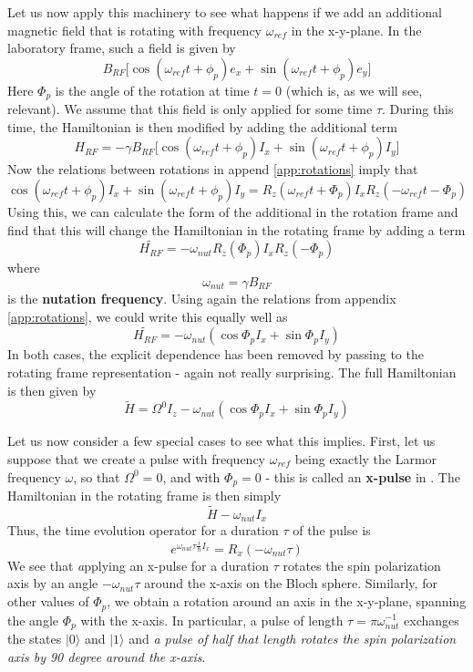 \documentclass[a4paper, draft]{article}
\theoremstyle{own}
\theoremstyle{remark}
\begin{document}
Let us now apply this machinery to see what happens if we add an additional magnetic field that is rotating with frequency $\omega_{ref}$ in the x-y-plane. In the laboratory frame, such a field is given by
$$
B_{RF} \big[ \cos (\omega_{ref} t + \phi_p) e_x + \sin(\omega_{ref} t + \phi_p) e_y \big] 
$$
Here $\Phi_p$ is the angle of the rotation at time $t = 0$ (which is, as we will see, relevant). We assume that this field is only applied for some time $\tau$. During this time, the Hamiltonian is then modified by adding the additional term
$$
H_{RF} = - \gamma B_{RF} \big[ \cos (\omega_{ref} t + \phi_p) I_x + \sin(\omega_{ref} t + \phi_p) I_y \big] 
$$
Now the relations between rotations in append \ref{app:rotations} imply that
$$
\cos (\omega_{ref} t + \phi_p) I_x + \sin(\omega_{ref} t + \phi_p) I_y 
=
R_z(\omega_{ref} t + \Phi_p) I_x R_z(-\omega_{ref} t - \Phi_p)
$$
Using this, we can calculate the form of the additional in the rotation frame and find that this will change the Hamiltonian in the rotating frame by adding a term
$$
\widetilde{H_{RF}} = - \omega_{nut} R_z(\Phi_p) I_x R_z(-\Phi_p)
$$
where 
$$
\omega_{nut} = \gamma B_{RF}
$$
is the {\bf nutation frequency}. Using again the relations from appendix \ref{app:rotations}, we could write this equally well as
$$
\widetilde{H_{RF}} = - \omega_{nut} ( \cos \Phi_p I_x + \sin \Phi_p I_y)
$$
In both cases, the explicit dependence has been removed by passing to the rotating frame representation - again not really surprising. The full Hamiltonian is then given by
$$
\widetilde{H} = \Omega^0 I_z - \omega_{nut} ( \cos \Phi_p I_x + \sin \Phi_p I_y)
$$


Let us now consider a few special cases to see what this implies. First, let us suppose that we create a pulse with frequency $\omega_{ref}$ being exactly the Larmor frequency $\omega$, so that $\Omega^0 = 0$, and with $\Phi_p = 0$ - this is called an {\bf x-pulse} in \cite{Levitt}. The Hamiltonian in the rotating frame is then simply
$$
\widetilde{H} - \omega_{nut} I_x
$$
Thus, the time evolution operator for a duration $\tau$ of the pulse is
$$
e^{ \omega_{nut} \tau \frac{i}{\hbar} I_x} = R_x(-\omega_{nut} \tau)
$$
We see that {\emph applying an x-pulse for a duration $\tau$ rotates the spin polarization axis by an angle $-\omega_{nut} \tau$ around the x-axis on the Bloch sphere}. Similarly, for other values of $\Phi_p$, we obtain a rotation around an axis in the x-y-plane, spanning the angle $\Phi_p$ with the x-axis. In particular, a pulse of length $\tau = \pi \omega_{nut}^{-1}$ exchanges the states $|0 \rangle$ and $|1 \rangle$ and  {\it a pulse of half that length  rotates the spin polarization axis by 90 degree around the x-axis}.
\end{document}
